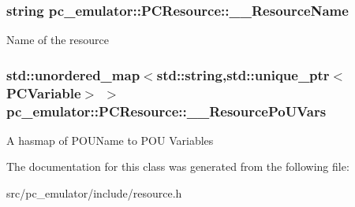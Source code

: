 \subsubsection[{\texorpdfstring{\+\_\+\+\_\+\+Resource\+Name}{__ResourceName}}]{\setlength{\rightskip}{0pt plus 5cm}string pc\+\_\+emulator\+::\+P\+C\+Resource\+::\+\_\+\+\_\+\+Resource\+Name}\hypertarget{classpc__emulator_1_1PCResource_a2ef3a8a76df532cdb7d913ee83ff67c8}{}\label{classpc__emulator_1_1PCResource_a2ef3a8a76df532cdb7d913ee83ff67c8}
Name of the resource 
\subsubsection[{\texorpdfstring{\+\_\+\+\_\+\+Resource\+Po\+U\+Vars}{__ResourcePoUVars}}]{\setlength{\rightskip}{0pt plus 5cm}std\+::unordered\+\_\+map$<$std\+::string,std\+::unique\+\_\+ptr$<${\bf P\+C\+Variable}$>$ $>$ pc\+\_\+emulator\+::\+P\+C\+Resource\+::\+\_\+\+\_\+\+Resource\+Po\+U\+Vars}\hypertarget{classpc__emulator_1_1PCResource_aead21e358bfd79dd6344c34980d51d5c}{}\label{classpc__emulator_1_1PCResource_aead21e358bfd79dd6344c34980d51d5c}
A hasmap of P\+O\+U\+Name to P\+OU Variables 

The documentation for this class was generated from the following file\+:\begin{DoxyCompactItemize}
\item 
src/pc\+\_\+emulator/include/resource.\+h\end{DoxyCompactItemize}
